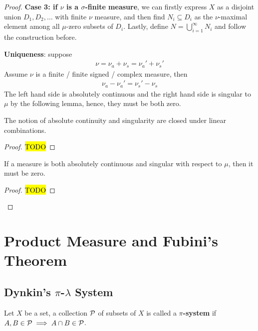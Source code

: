 \documentclass[11pt]{article}
\begin{document}
\begin{theorem}
\begin{proof}
			\textbf{Case 3: if $\nu$ is a $\sigma$-finite measure}, we can firstly express $X$ as a disjoint union $D_1, D_2, \dots$  with finite $\nu$ measure, and then find $N_i \subseteq D_i$ as the $\nu$-maximal element among all $\mu$-zero subsets of $D_i$.
			Lastly, define $N = \bigcup_{i=1}^\infty N_i$ and follow the construction before.
			
			\textbf{Uniqueness}: suppose
			\begin{align}
				\nu = \nu_a + \nu_s = \nu_a' + \nu_s'
			\end{align}
			Assume $\nu$ is a finite / finite signed / complex measure, then
			\begin{align}
				\nu_a - \nu_a' = \nu_s' - \nu_s
			\end{align}
			The left hand side is absolutely continuous and the right hand side is singular to $\mu$ by the following lemma, hence, they must be both zero.
			\begin{tcolorbox}
			\begin{lemma}
				The notion of absolute continuity and singularity are closed under linear combinations.
			\end{lemma}
			\begin{proof}
				\hl{TODO}
			\end{proof}
			\end{tcolorbox}
			\begin{tcolorbox}
			\begin{lemma}
				If a measure is both absolutely continuous and singular with respect to $\mu$, then it must be zero.
			\end{lemma}
			\begin{proof}
				\hl{TODO}
			\end{proof}
			\end{tcolorbox}
		\end{proof}
	\end{theorem}
	
	\newpage
	\section{Product Measure and Fubini's Theorem}
	\subsection{Dynkin's $\pi$-$\lambda$ System}
	\begin{definition}
		Let $X$ be a set, a collection $\mathcal{{P}}$ of subsets of $X$ is called a \textbf{$\pi$-system} if $A, B \in \mathcal{{P}} \implies A \cap B \in \mathcal{{P}}$.
	\end{definition}
	
\end{document}
